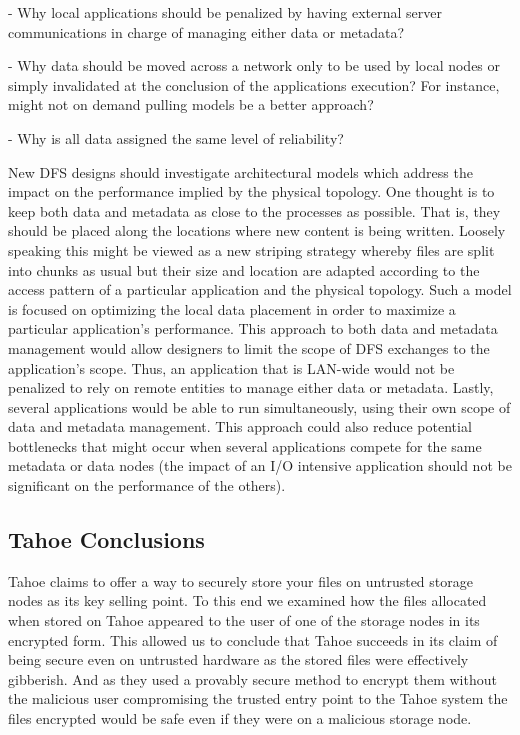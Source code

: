 \documentclass[11pt]{article}
\begin{document}
- Why local applications should be penalized by having external server 
communications in charge of managing either data or metadata?

- Why data should be moved across a network only to be used by local nodes or 
simply invalidated at the conclusion of the applications execution?  For instance, 
might not on demand pulling models be a better approach?

- Why is all data assigned the same level of reliability?

New DFS designs should investigate architectural models which address the impact 
on the performance implied by the physical topology. One thought is to keep both 
data and metadata as close to the processes as possible. That is, they should be 
placed along the locations where new content is being written. Loosely speaking this 
might be viewed as a new striping strategy whereby files are split into chunks as 
usual but their size and location are adapted according to the access pattern of a 
particular application and the physical topology. Such a model is focused on 
optimizing the local data placement in order to maximize a particular application’s 
performance. This approach to both data and metadata management would allow designers 
to limit the scope of DFS exchanges to the application’s scope. Thus, an application 
that is LAN-wide would not be penalized to rely on remote entities to manage either 
data or metadata. Lastly, several applications would be able to run simultaneously, 
using their own scope of data and metadata management. This approach could also reduce 
potential bottlenecks that might occur when several applications compete for the same 
metadata or data nodes (the impact of an I/O intensive application should not be 
significant on the performance of the others).

\subsection{Tahoe Conclusions}

Tahoe claims to offer a way to securely store your files on untrusted
storage nodes as its key selling point. To this end we examined how
the files allocated when stored on Tahoe appeared to the user of one
of the storage nodes in its encrypted form. This allowed us to
conclude that Tahoe succeeds in its claim of being secure even on
untrusted hardware as the stored files were effectively gibberish. And
as they used a provably secure method to encrypt them without the
malicious user compromising the trusted entry point to the Tahoe
system the files encrypted would be safe even if they were on a
malicious storage node.
\end{document}
